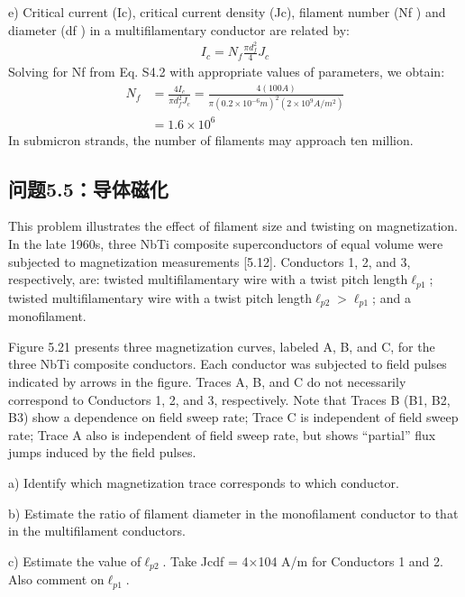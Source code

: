 e) Critical current (Ic), critical current density (Jc), filament number (Nf ) and
diameter (df ) in a multifilamentary conductor are related by:
\begin{align*}%
I_c=N_f\frac{\pi d_f^2}{4} J_c \tag{S4.2}
\end{align*}
Solving for Nf from Eq. S4.2 with appropriate values of parameters, we obtain:
\begin{align*}%
N_{f}&=\frac{4I_{c}}{\pi d_{f}^{2}J_{c}}=\frac{4(100A)}{\pi(0.2\times10^{-6}m)^{2}(2\times10^{9}A/m^{2})}\\
&=1.6\times 10^{6}
\end{align*}
In submicron strands, the number of filaments may approach ten million.



\subsection{问题5.5：导体磁化}
This problem illustrates the effect of filament size and twisting on magnetization.
In the late 1960s, three NbTi composite superconductors of equal volume were
subjected to magnetization measurements [5.12]. Conductors 1, 2, and 3, respectively,
are: twisted multifilamentary wire with a twist pitch length$\ell_{p1}$; twisted
multifilamentary wire with a twist pitch length$\ell_{p2}>\ell_{p1}$; and a monofilament.


Figure 5.21 presents three magnetization curves, labeled A, B, and C, for the
three NbTi composite conductors. Each conductor was subjected to field pulses
indicated by arrows in the figure. Traces A, B, and C do not necessarily correspond
to Conductors 1, 2, and 3, respectively. Note that Traces B (B1, B2, B3) show a
dependence on field sweep rate; Trace C is independent of field sweep rate; Trace
A also is independent of field sweep rate, but shows “partial” flux jumps induced
by the field pulses.

a) Identify which magnetization trace corresponds to which conductor.

b) Estimate the ratio of filament diameter in the monofilament conductor to
that in the multifilament conductors.

c) Estimate the value of$\ell_{p2}$. Take Jcdf = 4×104 A/m for Conductors 1 and 2.
Also comment on$\ell_{p1}$.

